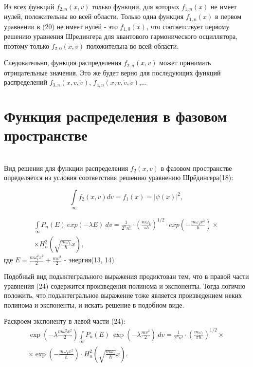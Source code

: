 \documentclass[a4paper,14pt]{article}
\begin{document}
Из всех функций $f _{2, n}(x, v)$ только функции, для которых $f_{1, n}(x)$ не имеет нулей, положительны во всей области. Только одна функция $f_{1,n}(x)$ в первом уравнении в (20) не имеет нулей - это $f_{1,0}(x)$, что соответствует первому решению уравнения Шредингера для квантового гармонического осциллятора, поэтому только $f_{2,0}(x, v)$ положительна во всей области. 

Следовательно,  функция распределения $f _{2, n}(x, v)$ может принимать отрицательные значения. Это же будет верно для последующих функций распределений  $f _{3,n}(x, v, \dot v)$, $f _{4,n}(x, v, \dot v, \ddot v)$,$\ldots$

\newpage
\section{Функция распределения в фазовом пространстве}
~ \\
Вид решения для функции распределения $f_2(x, v)$ в фазовом пространстве определяется из условия соответствия решению уравнению Шрёдингера(18):

\begin{equation}
\int\limits_{\infty} f_2(x, v) dv = f_1(x) = |\psi(x)|^2,
\end{equation}

\begin{eqnarray}
\int\limits_{\infty} P_n(E) ~ exp(-\lambda E) ~ dv = \frac{1} {{2^n n!}} \cdot \left({\frac{m \omega_1}{\pi \hbar}}\right)^{1/2} \cdot exp\left(-\frac{m \omega_1 x^2}{\hbar}\right) \times \nonumber\\ \times H_n^2\left(\sqrt{\frac{m \omega_1}{\hbar}}x\right),
\end{eqnarray}
где $E=\frac{m \omega_1^2 x^2}{2}+\frac{mv^2}{2}$ - энергия(13, 14)

Подобный вид подынтегрального выражения продиктован тем, что в правой части уравнения (24) содержится произведения полинома и экспоненты. Тогда логично положить, что подынтегральное выражение тоже является произведением неких полинома и экспоненты, и искать решение в подобном виде.

Раскроем экспоненту в левой части (24):
\begin{eqnarray}
\exp\left(-\lambda \frac{m \omega_1^2 x^2}{2}\right)\int\limits_{\infty} P_n(E) ~ \exp \left(-\lambda \frac{mv^2}{2}\right)  ~ dv = \frac{1} {{2^n n!}} \cdot \left({\frac{m \omega_1}{\pi \hbar}}\right)^{1/2} \times \nonumber\\ \times \exp\left(-\frac{m \omega_1 x^2}{\hbar}\right) \cdot H_n^2\left(\sqrt{\frac{m \omega_1}{\hbar}}x\right).
\end{eqnarray}
\end{document}
